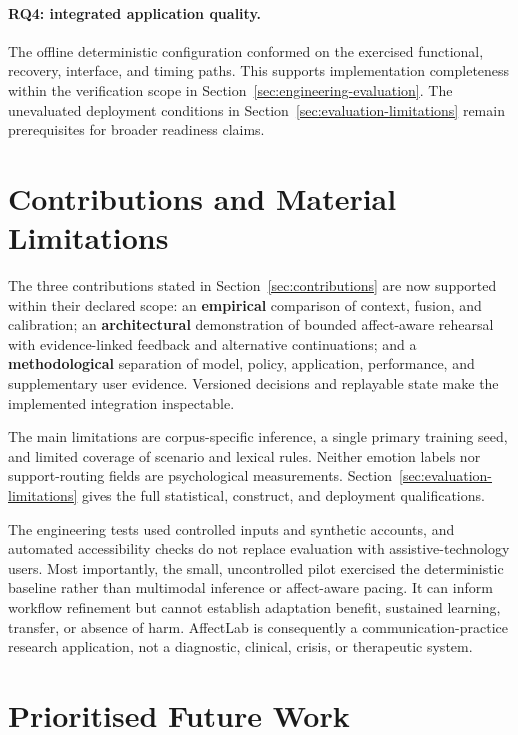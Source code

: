 \paragraph{RQ4: integrated application quality.}
\label{subsec:conclusion-rq4}
The offline deterministic configuration conformed on the exercised functional, recovery, interface, and timing paths. This supports implementation completeness within the verification scope in Section~\ref{sec:engineering-evaluation}. The unevaluated deployment conditions in Section~\ref{sec:evaluation-limitations} remain prerequisites for broader readiness claims.

\section{Contributions and Material Limitations}
\label{sec:conclusion-contributions}

The three contributions stated in Section~\ref{sec:contributions} are now supported within their declared scope: an \textbf{empirical} comparison of context, fusion, and calibration; an \textbf{architectural} demonstration of bounded affect-aware rehearsal with evidence-linked feedback and alternative continuations; and a \textbf{methodological} separation of model, policy, application, performance, and supplementary user evidence. Versioned decisions and replayable state make the implemented integration inspectable.

The main limitations are corpus-specific inference, a single primary training seed, and limited coverage of scenario and lexical rules. Neither emotion labels nor support-routing fields are psychological measurements. Section~\ref{sec:evaluation-limitations} gives the full statistical, construct, and deployment qualifications.

The engineering tests used controlled inputs and synthetic accounts, and automated accessibility checks do not replace evaluation with assistive-technology users. Most importantly, the small, uncontrolled pilot exercised the deterministic baseline rather than multimodal inference or affect-aware pacing. It can inform workflow refinement but cannot establish adaptation benefit, sustained learning, transfer, or absence of harm. AffectLab is consequently a communication-practice research application, not a diagnostic, clinical, crisis, or therapeutic system.

\section{Prioritised Future Work}
\label{sec:conclusion-future-work}

